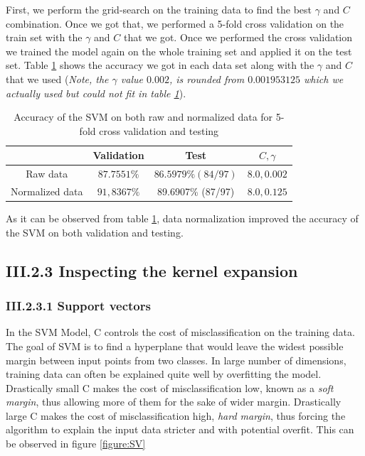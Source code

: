 \documentclass[12pt]{article}
\begin{document}
    First, we perform the grid-search on the training data to find the best $\gamma$ and $C$ combination. Once we got that, we performed a 5-fold cross validation on the train set with the $\gamma$ and $C$ that we got. Once we performed the cross validation we trained the model again on the whole training set and applied it on the test set. Table \ref{table:accuracies} shows the accuracy we got in each data set along with the $\gamma$ and $C$ that we used (\textit{Note, the  $\gamma$ value $0.002$, is rounded from $0.001953125$ which we actually used but could not fit in table \ref{table:accuracies}}).
    \begin{table}[h]
      \centering
      \begin{tabular}{|c|c|c|c|} \hline
      & Validation &  Test  & $C, \gamma $\\ \hline
      Raw data  & $87.7551\%$ &  $86.5979\% (84/97)$& $8.0, 0.002$ \\ \hline
      Normalized data & $91,8367\%$ & 89.6907\% (87/97) & $8.0, 0.125$\\ \hline
      \end{tabular}
      \caption{Accuracy of the SVM on both raw and normalized data for 5-fold cross validation and testing}      
      \label{table:accuracies}
    \end{table}

    As it can be observed from table \ref{table:accuracies}, data normalization improved the accuracy of the SVM on both validation and testing.
    
  \subsection*{III.2.3 Inspecting the kernel expansion}

    \subsubsection*{III.2.3.1 Support vectors}

      In the SVM Model, C controls the cost of misclassification on the training data. The goal of SVM is to find a hyperplane that would leave the widest possible margin between input points from two classes. In large number of dimensions, training data can often be explained quite well by overfitting the model. Drastically small C makes the cost of misclassification low, known as a \textit{soft margin}, thus allowing more of them for the sake of wider margin. Drastically large C makes the cost of misclassification high, \textit{hard margin}, thus forcing the algorithm to explain the input data stricter and with potential overfit. This can be observed in figure \ref{figure:SV}
\end{document}
